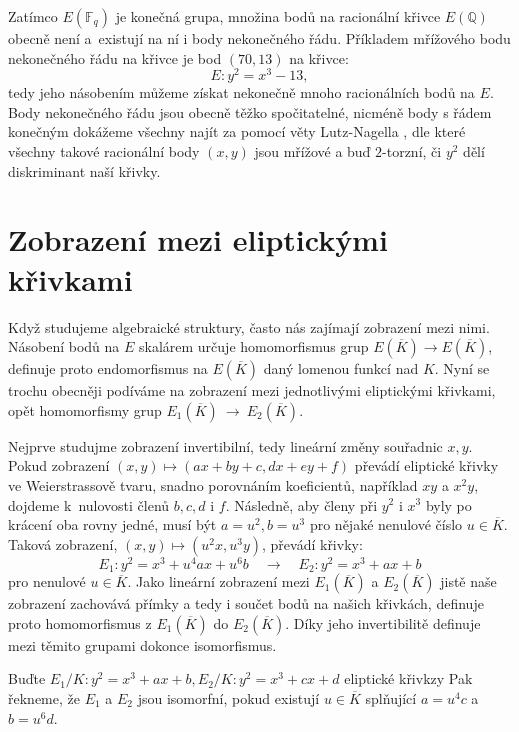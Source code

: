 \documentclass[12pt]{report}
\begin{document}
Zatímco $E(\mathbb{F}_q)$ je konečná grupa, množina bodů na racionální křivce $E(\mathbb{Q})$ obecně není a~existují na ní i body nekonečného řádu. Příkladem mřížového bodu nekonečného řádu na křivce je bod $(70,13)$ na křivce:
\begin{equation*}
E : y^2 = x^3 - 13,
\end{equation*}
tedy jeho násobením můžeme získat nekonečně mnoho racionálních bodů na $E$. Body nekonečného řádu jsou obecně těžko spočitatelné, nicméně body s řádem konečným dokážeme všechny najít za pomocí věty Lutz-Nagella \cite[Thm. 8.7]{Washington}, dle které všechny takové racionální body $(x,y)$ jsou mřížové a buď $2$-torzní, či $y^2$ dělí diskriminant naší křivky.

\section{Zobrazení mezi eliptickými křivkami}

Když studujeme algebraické struktury, často nás zajímají zobrazení mezi nimi. Násobení bodů na $E$ skalárem určuje homomorfismus grup $E(\overline{K}) \longrightarrow E(\overline{K})$, definuje proto endomorfismus na $E(\overline{K})$ daný lomenou funkcí nad $K$. Nyní se trochu obecněji podíváme na zobrazení mezi jednotlivými eliptickými křivkami, opět homomorfismy grup $E_1(\overline{K})~\longrightarrow~E_2(\overline{K})$.

Nejprve studujme zobrazení invertibilní, tedy lineární změny souřadnic $x,y$. Pokud zobrazení $(x,y) \mapsto (ax+by+c,dx+ey+f)$ převádí eliptické křivky ve Weierstrassově tvaru, snadno porovnáním koeficientů, například $xy$ a $x^2 y$, dojdeme k~nulovosti členů $b,c,d$ i $f$. Následně, aby členy při $y^2$ i $x^3$ byly po krácení oba rovny jedné, musí být $a = u^2, b = u^3$ pro nějaké nenulové číslo $u \in \overline{K}$. Taková zobrazení, $(x,y) \mapsto (u^2 x, u^3 y)$, převádí křivky:
\begin{equation*}
E_1 : y^2 = x^3 + u^4 a x + u^6 b \quad \longrightarrow \quad E_2 :  y^2 = x^3 + ax + b 
\end{equation*}
pro nenulové $u \in \overline{K}$. Jako lineární zobrazení mezi $E_1(\overline{K})$ a $E_2(\overline{K})$ jistě naše zobrazení zachovává přímky a tedy i součet bodů na našich křivkách, definuje proto homomorfismus z $E_1(\overline{K})$ do $E_2(\overline{K})$. Díky jeho invertibilitě definuje mezi těmito grupami dokonce isomorfismus.

\begin{definice}
Buďte $E_1/K : y^2 = x^3 + ax + b, E_2/K : y^2 = x^3 + cx + d$ eliptické křivkzy Pak řekneme, že $E_1$ a $E_2$ jsou isomorfní, pokud existují $u \in \overline{K}$ splňující $a = u^4 c$ a $b = u^6 d$.
\end{definice}
\end{document}
